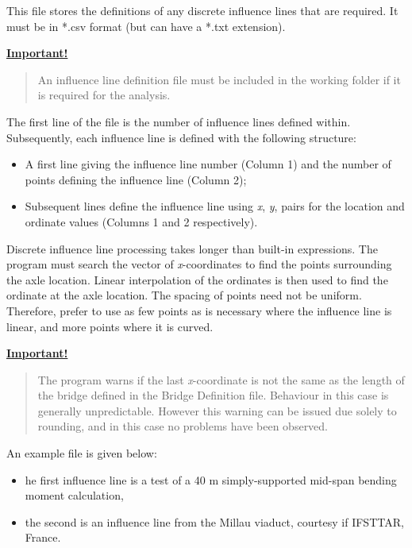 \documentclass[
]{article}
\begin{document}
This file stores the definitions of any discrete influence lines that
are required. It must be in *.csv format (but can have a *.txt
extension).

\textbf{\ul{Important!}}

\begin{quote}
An influence line definition file must be included in the working folder
if it is required for the analysis.
\end{quote}

The first line of the file is the number of influence lines defined
within. Subsequently, each influence line is defined with the following
structure:

\begin{itemize}
\item
  A first line giving the influence line number (Column 1) and the
  number of points defining the influence line (Column 2);
\item
  Subsequent lines define the influence line using \emph{x}, \emph{y},
  pairs for the location and ordinate values (Columns 1 and 2
  respectively).
\end{itemize}

Discrete influence line processing takes longer than built-in
expressions. The program must search the vector of \emph{x}-coordinates
to find the points surrounding the axle location. Linear interpolation
of the ordinates is then used to find the ordinate at the axle location.
The spacing of points need not be uniform. Therefore, prefer to use as
few points as is necessary where the influence line is linear, and more
points where it is curved.

\textbf{\ul{Important!}}

\begin{quote}
The program warns if the last \emph{x}-coordinate is not the same as the
length of the bridge defined in the Bridge Definition file. Behaviour in
this case is generally unpredictable. However this warning can be issued
due solely to rounding, and in this case no problems have been observed.
\end{quote}

An example file is given below:

\begin{itemize}
\item
  he first influence line is a test of a 40 m simply-supported mid-span
  bending moment calculation,
\item
  the second is an influence line from the Millau viaduct, courtesy if
  IFSTTAR, France.
\end{itemize}
\end{document}
